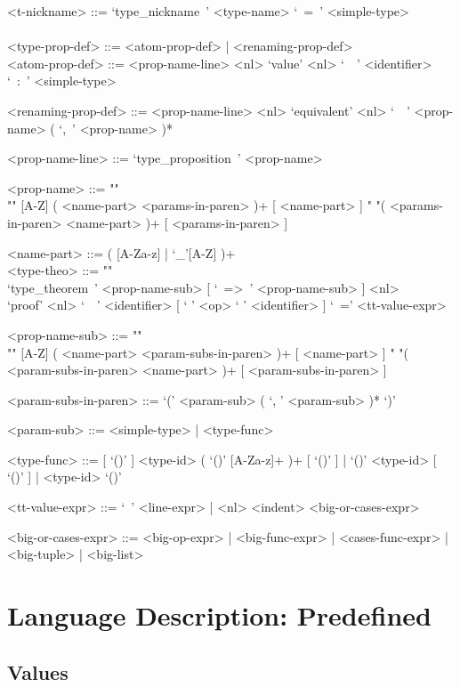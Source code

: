 \documentclass{article}
\begin{document}
\begin{grammar}
<t-nickname> ::= `type_nickname\ ' <type-name> `\ =\ ' <simple-type>
\\\\

<type-prop-def> ::= <atom-prop-def> | <renaming-prop-def>
\\

<atom-prop-def> ::=
<prop-name-line> <nl> `value' <nl> `\ \ ' <identifier> `\ :\ ' <simple-type>

<renaming-prop-def> ::=
<prop-name-line> <nl> `equivalent' <nl> `\ \ ' <prop-name> ( `,\ ' <prop-name> )*

<prop-name-line> ::= `type_proposition\ ' <prop-name>

<prop-name> ::=  ""\\""
[A-Z] ( <name-part> <params-in-paren> )+ [ <name-part> ]
\alt " "( <params-in-paren> <name-part> )+ [ <params-in-paren> ]

<name-part> ::= ( [A-Za-z] | `_'[A-Z] )+
\\

<type-theo> ::= ""\\
`type_theorem\ ' <prop-name-sub> [ `\ =>\ ' <prop-name-sub> ] <nl> \\
`proof' <nl> `\ \ ' <identifier> [ ` ' <op> ` ' <identifier> ] `\ =' <tt-value-expr>

<prop-name-sub> ::=  ""\\""
[A-Z] ( <name-part> <param-subs-in-paren> )+ [ <name-part> ]
\alt " "( <param-subs-in-paren> <name-part> )+ [ <param-subs-in-paren> ]

<param-subs-in-paren> ::= `(' <param-sub> ( `, ' <param-sub> )* `)'

<param-sub> ::= <simple-type> | <type-func>

<type-func> ::=
[ `()' ] <type-id> ( `()' [A-Za-z]+ )+ [ `()' ] | `()' <type-id> [ `()' ] |
<type-id> `()'

<tt-value-expr> ::= `\ ' <line-expr> | <nl> <indent> <big-or-cases-expr>

<big-or-cases-expr> ::=
<big-op-expr> | <big-func-expr> | <cases-func-expr> |
<big-tuple> | <big-list>
\end{grammar}

\section{Language Description: Predefined}

\subsection{Values}
\end{document}
